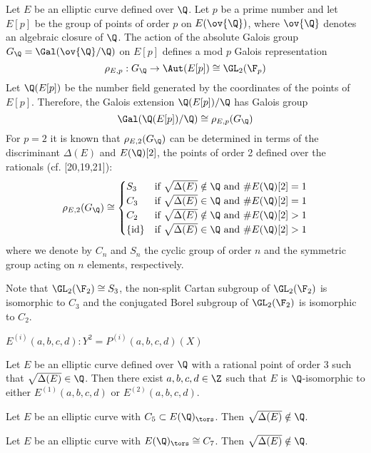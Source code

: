 Let $E$ be an elliptic curve defined over $\Q$. Let $p$ be a prime number and let $E[p]$ be the group of points of order $p$ on $E(\ov{\Q})$, where $\ov{\Q}$ denotes an algebraic closure of $\Q$. The action of the absolute Galois group $G_\Q= \Gal(\ov{\Q}/\Q)$ on $E[p]$ defines a mod $p$ Galois representation
	\[
	\rho_{E,p}: G_\Q \to \Aut(E[p]) \cong \GL_2(\F_p)
	\]
Let $\Q(E[p])$ be the number field generated by the coordinates of the points of $E[p]$. Therefore, the Galois extension $\Q(E[p])/\Q$ has Galois group
	\[
	\Gal(\Q(E[p])/\Q) \cong \rho_{E,p}(G_\Q)
	\]
For $p= 2$ it is known that $\rho_{E,2}(G_\Q)$ can be determined in terms of the discriminant $\Delta(E)$ and $E(\Q)[2]$, the points of order 2 defined over the rationals (cf. [20,19,21]):
	\[
	\rho_{E,2}(G_\Q) \cong
	\begin{cases}
	S_3 & \text{if } \sqrt{\Delta(E)} \notin \Q \text{ and } \#E(\Q)[2]= 1 \\
	C_3 & \text{if } \sqrt{\Delta(E)} \in \Q \text{ and } \#E(\Q)[2]= 1 \\
	C_2 & \text{if } \sqrt{\Delta(E)} \notin \Q \text{ and } \#E(\Q)[2] > 1 \\
	\{\text{id}\} & \text{if } \sqrt{\Delta(E)} \in \Q \text{ and } \#E(\Q)[2] > 1
	\end{cases}
	\]
where we denote by $C_n$ and $S_n$ the cyclic group of order $n$ and the symmetric group acting on $n$ elements, respectively.


Note that $\GL_2(\F_2) \cong S_3$, the non-split Cartan subgroup of $\GL_2(\F_2)$ is isomorphic to $C_3$ and the conjugated Borel subgroup of $\GL_2(\F_2)$ is isomorphic to $C_2$.



$E^{(i)}(a,b,c,d) \colon Y^2 = P^{(i)}(a,b,c,d)(X)$


\begin{prop} %
 Let $E$ be an elliptic curve defined over $\Q$ with a rational point of order 3 such that $\sqrt{\Delta(E)} \in \Q$. Then there exist $a,b,c,d \in \Z$ such that $E$ is $\Q$-isomorphic to either $E^{(1)}(a,b,c,d)$ or $E^{(2)}(a,b,c,d)$.
\end{prop}


\begin{prop} %
Let $E$ be an elliptic curve with $C_5 \subset E(\Q)_\tors$. Then $\sqrt{\Delta(E)} \notin \Q$. 
\end{prop}


\begin{prop} %
Let $E$ be an elliptic curve with $E(\Q)_\tors \cong C_7$. Then $\sqrt{\Delta(E)} \notin \Q$. 
\end{prop}



